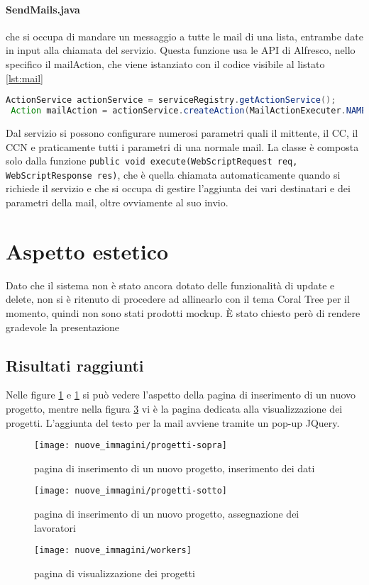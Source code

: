 \paragraph{SendMails.java} che si occupa di mandare un messaggio a tutte le mail di una lista, entrambe date in input alla chiamata del servizio. Questa funzione usa le \gls{API} di Alfresco, nello specifico il mailAction, che viene istanziato con il codice visibile al listato \ref{lst:mail}
\begin{lstlisting}[language=Java,caption=set dell'actionservice per le mail,label=lst:mail]
 ActionService actionService = serviceRegistry.getActionService();
 Action mailAction = actionService.createAction(MailActionExecuter.NAME);
\end{lstlisting}
Dal servizio si possono configurare numerosi parametri quali il mittente, il CC, il CCN e praticamente tutti i parametri di una normale mail.
La classe è composta solo dalla funzione \texttt{public void execute(WebScriptRequest req, WebScriptResponse res)}, che è quella chiamata automaticamente quando si richiede il servizio e che si occupa di gestire l'aggiunta dei vari destinatari e dei parametri della mail, oltre ovviamente al suo invio.
\section{Aspetto estetico}
Dato che il sistema non è stato ancora dotato delle funzionalità di update e delete, non si è ritenuto di procedere ad allinearlo con il tema Coral Tree per il momento, quindi non sono stati prodotti mockup. È stato chiesto però di rendere gradevole la presentazione
\subsection{Risultati raggiunti}
Nelle figure \ref{fig:progetti-sopra} e \ref{fig:progetti-sopra} si può vedere l'aspetto della pagina di inserimento di un nuovo progetto, mentre nella figura \ref{fig:workers} vi è la pagina dedicata alla visualizzazione dei progetti. L'aggiunta del testo per la mail avviene tramite un pop-up JQuery.
\begin{figure}[!ht]
\centering
\texttt{[image: nuove\_immagini/progetti-sopra]}
\caption{pagina di inserimento di un nuovo progetto, inserimento dei dati\label{fig:progetti-sopra}}
\end{figure}
\begin{figure}[!ht]
\centering
\texttt{[image: nuove\_immagini/progetti-sotto]}
\caption{pagina di inserimento di un nuovo progetto, assegnazione dei lavoratori \label{fig:progetti-sotto}}
\end{figure}
\begin{figure}[!ht]
\centering
\texttt{[image: nuove\_immagini/workers]}
\caption{pagina di visualizzazione dei progetti \label{fig:workers}}
\end{figure}